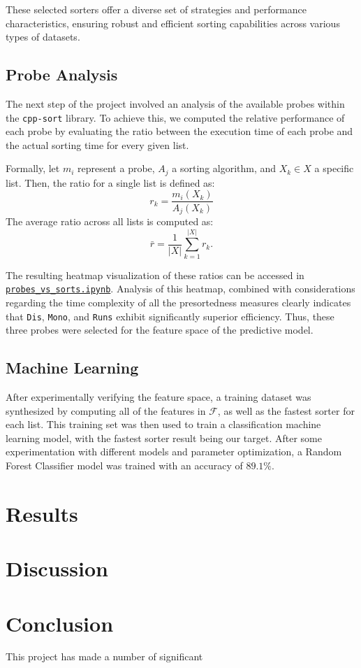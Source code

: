 \documentclass[twocolumn]{article}
\begin{document}
These selected sorters offer a diverse set of strategies and performance characteristics, ensuring robust and efficient sorting capabilities across various types of datasets.

\subsection{Probe Analysis}
The next step of the project involved an analysis of the available probes within the \texttt{cpp-sort} library. To achieve this, we computed the relative performance of each probe by evaluating the ratio between the execution time of each probe and the actual sorting time for every given list.

Formally, let $m_i$ represent a probe, $A_j$ a sorting algorithm, and $X_k \in X$ a specific list. Then, the ratio for a single list is defined as:
\[
    r_k = \frac{m_i(X_k)}{A_j(X_k)}
\]
The average ratio across all lists is computed as:
\[
    \bar{r} = \frac{1}{|X|}\sum_{k=1}^{|X|} r_k.
\]

The resulting heatmap visualization of these ratios can be accessed in  \href{https://github.com/kiselevart/sorting-selector/blob/main/Implementation/analysis/probes_vs_sorts.ipynb}{\texttt{probes\_vs\_sorts.ipynb}}. Analysis of this heatmap, combined with considerations regarding the time complexity of all the presortedness measures clearly indicates that \texttt{Dis}, \texttt{Mono}, and \texttt{Runs} exhibit significantly superior efficiency. Thus, these three probes were selected for the feature space of the predictive model.

\subsection{Machine Learning}
After experimentally verifying the feature space, a training dataset was synthesized by computing all of the features in $\mathcal{F}$, as well as the fastest sorter for each list. This training set was then used to train a classification machine learning model, with the fastest sorter result being our target. After some experimentation with different models and parameter optimization, a Random Forest Classifier\cite{breiman2001random} model was trained with an accuracy of $89.1\%$.

\section{Results}

\section{Discussion}

\section{Conclusion}
This project has made a number of significant 



\end{document}
